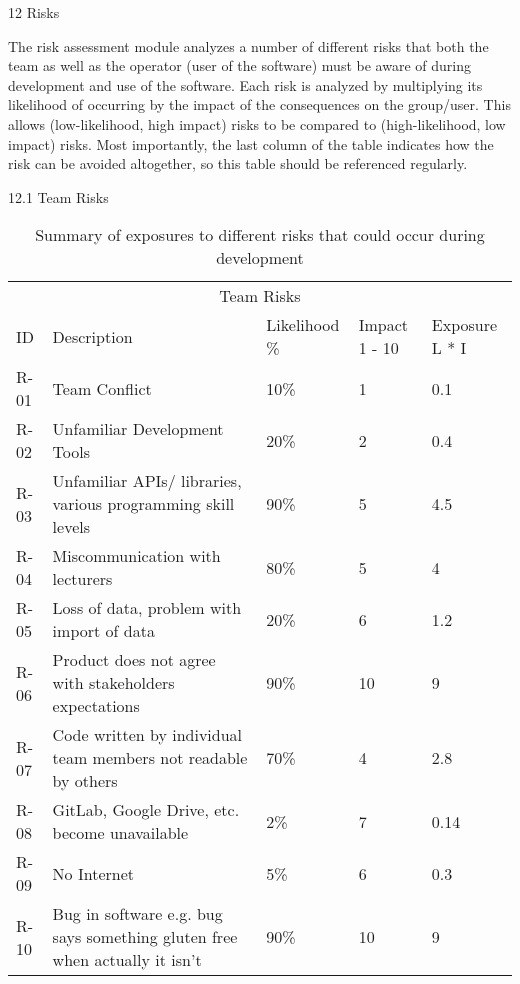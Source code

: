 12 Risks

The risk assessment module analyzes a number of different risks that both the team as well as the operator (user of the software) must be aware of during development and use of the software. Each risk is analyzed by multiplying its likelihood of occurring by the impact of the consequences on the group/user. This allows (low-likelihood, high impact) risks to be compared to (high-likelihood, low impact) risks. Most importantly, the last column of the table indicates how the risk can be avoided altogether, so this table should be referenced regularly.

12.1 Team Risks

\begin{table}
    \centering
    \caption{Summary of exposures to different risks that could occur during development}
    \begin{tabular}{lllll}
        \multicolumn{5}{c}{Team Risks}                                                                                                      \\
        ID   & Description                                                                & Likelihood \% & Impact 1 - 10 & Exposure L * I  \\
        R-01 & Team Conflict                                                              & 10\%          & 1             & 0.1             \\
        R-02 & Unfamiliar Development Tools                                               & 20\%          & 2             & 0.4             \\
        R-03 & Unfamiliar APIs/ libraries, various programming skill levels               & 90\%          & 5             & 4.5             \\
        R-04 & Miscommunication with lecturers                                            & 80\%          & 5             & 4               \\
        R-05 & Loss of data, problem with import of data                                  & 20\%          & 6             & 1.2             \\
        R-06 & Product does not agree with stakeholders expectations                      & 90\%          & 10            & 9               \\
        R-07 & Code written by individual team members not readable by others             & 70\%          & 4             & 2.8             \\
        R-08 & GitLab, Google Drive, etc. become unavailable                              & 2\%           & 7             & 0.14            \\
        R-09 & No Internet                                                                & 5\%           & 6             & 0.3             \\
        R-10 & Bug in software e.g. bug says something gluten free when actually it isn’t & 90\%          & 10            & 9
    \end{tabular}
\end{table}


